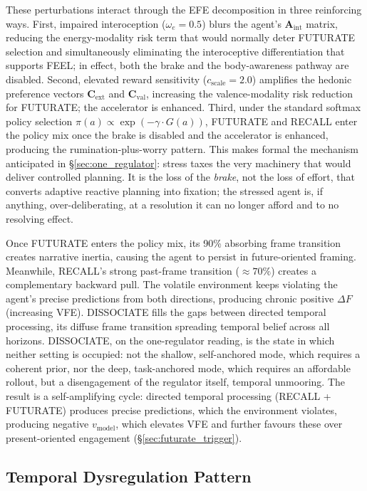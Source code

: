 \documentclass[11pt,a4paper]{article}
\newcommand{\rr}{\color{red!70!black}}
\begin{document}
These perturbations interact through the EFE decomposition in three reinforcing ways. First, impaired interoception ($\omega_e = 0.5$) blurs the agent's $\mathbf{A}_{\text{int}}$ matrix, reducing the energy-modality risk term that would normally deter FUTURATE selection and simultaneously eliminating the interoceptive differentiation that supports FEEL; in effect, both the brake and the body-awareness pathway are disabled. Second, elevated reward sensitivity ($c_{\text{scale}} = 2.0$) amplifies the hedonic preference vectors $\mathbf{C}_{\text{ext}}$ and $\mathbf{C}_{\text{val}}$, increasing the valence-modality risk reduction for FUTURATE; the accelerator is enhanced. Third, under the standard softmax policy selection $\pi(a) \propto \exp(-\gamma \cdot G(a))$, FUTURATE and RECALL enter the policy mix once the brake is disabled and the accelerator is enhanced, producing the rumination-plus-worry pattern. {\rr This makes formal the mechanism anticipated in \S\ref{sec:one_regulator}: stress taxes the very machinery that would deliver controlled planning. It is the loss of the \emph{brake}, not the loss of effort, that converts adaptive reactive planning into fixation; the stressed agent is, if anything, over-deliberating, at a resolution it can no longer afford and to no resolving effect.}

Once FUTURATE enters the policy mix, its 90\% absorbing frame transition creates narrative inertia, causing the agent to persist in future-oriented framing. Meanwhile, RECALL's strong past-frame transition ($\approx 70\%$) creates a complementary backward pull. The volatile environment keeps violating the agent's precise predictions from both directions, producing chronic positive $\Delta F$ (increasing VFE). DISSOCIATE fills the gaps between directed temporal processing, its diffuse frame transition spreading temporal belief across all horizons. {\rr DISSOCIATE, on the one-regulator reading, is the state in which neither setting is occupied: not the shallow, self-anchored mode, which requires a coherent prior, nor the deep, task-anchored mode, which requires an affordable rollout, but a disengagement of the regulator itself, temporal unmooring.} The result is a self-amplifying cycle: directed temporal processing (RECALL + FUTURATE) produces precise predictions, which the environment violates, producing negative $v_{\text{model}}$, which elevates VFE and further favours these over present-oriented engagement (\S\ref{sec:futurate_trigger}).

\subsection{Temporal Dysregulation Pattern}\label{sec:temporal_dysreg}
\end{document}

